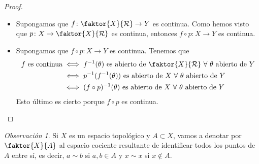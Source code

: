 \documentclass[12pt]{report}
\theoremstyle{definition}
\theoremstyle{definition}
\theoremstyle{remark}
\newtheorem*{obs}{Observación} %
\begin{document}
\begin{proof}
\hfill
\begin{itemize}
    \item[{\fbox[rb]{$\Rightarrow$}}] Supongamos que $f \colon \faktor{X}{\mathcal{R}} \to Y$ es continua. Como hemos visto que $p \colon X \to \faktor{X}{\mathcal{R}}$ es continua, entonces $f \circ p \colon X \to Y$ es continua.
    \item[{\fbox[rb]{$\Leftarrow$}}] Supongamos que $f \circ p \colon X \to Y$ es continua. Tenemos que 
    \[
    \begin{aligned}[t]
        f \textrm{ es continua} &\iff f^{-1}(\theta) \textrm{ es abierto de } \faktor{X}{\mathcal{R}} \ \forall \ \theta \textrm{ abierto de } Y \\
        &\iff p^{-1}(f^{-1}(\theta)) \textrm{ es abierto de } X \ \forall \ \theta \textrm{ abierto de } Y \\
        &\iff (f \circ p)^{-1}(\theta) \textrm{ es abierto de } X \ \forall \ \theta \textrm{ abierto de } Y
    \end{aligned}
    \] Esto último es cierto porque $f \circ p$ es continua.
\end{itemize}
\end{proof}

\begin{obs}
Si $X$ es un espacio topológico y $A \subset X$, vamos a denotar por $\faktor{X}{A}$ al espacio cociente resultante de identificar todos los puntos de $A$ entre sí, es decir, $a \sim b$ si $a, b \in A$ y $x \sim x$ si $x \notin A$.
\end{obs}
\end{document}
